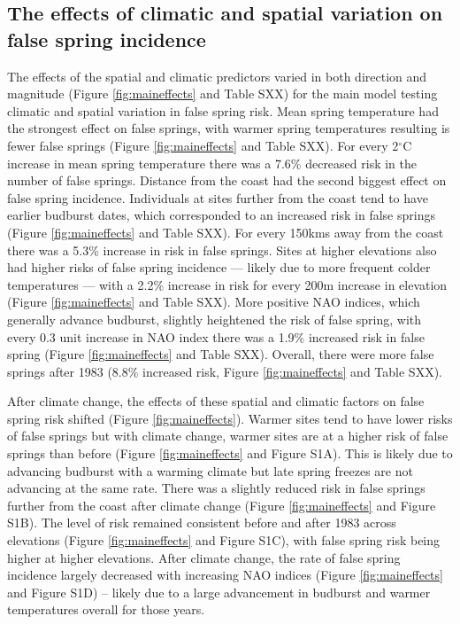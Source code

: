 \documentclass{article}\usepackage[]{graphicx}\usepackage[]{color}
\begin{document}
\subsection*{The effects of climatic and spatial variation on false spring incidence}
The effects of the spatial and climatic predictors varied in both direction and magnitude (Figure \ref{fig:maineffects} and Table SXX) for the main model testing climatic and spatial variation in false spring risk. Mean spring temperature had the strongest effect on false springs, with warmer spring temperatures resulting is fewer false springs (Figure \ref{fig:maineffects} and Table SXX). For every 2$^{\circ}$C increase in mean spring temperature there was a 7.6\% decreased risk in the number of false springs. Distance from the coast had the second biggest effect on false spring incidence. Individuals at sites further from the coast tend to have earlier budburst dates, which corresponded to an increased risk in false springs (Figure \ref{fig:maineffects} and Table SXX). For every 150kms away from the coast there was a 5.3\% increase in risk in false springs. Sites at higher elevations also had higher risks of false spring incidence --- likely due to more frequent colder temperatures --- with a 2.2\% increase in risk for every 200m increase in elevation (Figure \ref{fig:maineffects} and Table SXX). More positive NAO indices, which generally advance budburst, slightly heightened the risk of false spring, with every 0.3 unit increase in NAO index there was a 1.9\% increased risk in false spring (Figure \ref{fig:maineffects} and Table SXX). Overall, there were more false springs after 1983 (8.8\% increased risk, Figure \ref{fig:maineffects} and Table SXX). 

After climate change, the effects of these spatial and climatic factors on false spring risk shifted (Figure \ref{fig:maineffects}).
Warmer sites tend to have lower risks of false springs but with climate change, warmer sites are at a higher risk of false springs than before (Figure \ref{fig:maineffects} and Figure S1A). This is likely due to advancing budburst with a warming climate but late spring freezes are not advancing at the same rate. There was a slightly reduced risk in false springs further from the coast after climate change (Figure \ref{fig:maineffects} and Figure S1B). The level of risk remained consistent before and after 1983 across elevations (Figure \ref{fig:maineffects} and Figure S1C), with false spring risk being higher at higher elevations. After climate change, the rate of false spring incidence largely decreased with increasing NAO indices (Figure \ref{fig:maineffects} and Figure S1D) -- likely due to a large advancement in budburst and warmer temperatures overall for those years. 
\end{document}
